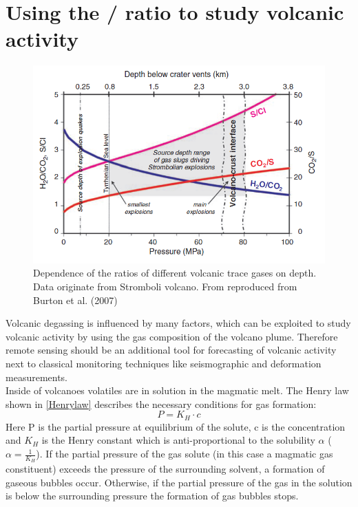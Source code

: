 \documentclass  [
  paper    = a4,
  BCOR     = 10mm,
  twoside,
  fontsize = 12pt,
  fleqn,
  toc      = bibnumbered,
  toc      = listofnumbered,
  numbers  = noendperiod,
  headings = normal,
  listof   = leveldown,
  version  = 3.03
]                                       {scrreprt}
\begin{document}
\section{Using the /  ratio to study volcanic activity}
\begin{figure}[h]
	\centering
	\includegraphics[width=0.9\linewidth]{Zwischenbericht2018/Bilder/so2_bro}
	\caption{Dependence of the ratios of different volcanic trace gases on depth. Data originate from Stromboli volcano. From \citet{lubcke2014optical} reproduced from Burton et al. (2007)}
	\label{fig:so2bro}
\end{figure}    
Volcanic degassing is influenced by many factors, which can be exploited to study volcanic activity by using the gas composition of the volcano plume. Therefore remote sensing should be an additional tool for forecasting of volcanic activity next to classical monitoring techniques like seismographic and deformation measurements.\\
Inside of volcanoes volatiles are in solution in the magmatic melt. The Henry law shown in \cref{Henrylaw} describes the necessary conditions for gas formation:
\begin{equation}
P = K_{H}\cdot c
\label{Henrylaw}
\end{equation}
Here P is the partial pressure at equilibrium of the solute, c is the concentration and $ K_{H}$ is the Henry constant which is anti-proportional to the solubility $\alpha$ ($\alpha = \frac{1}{ K_{H}}$).
If the partial pressure of the gas solute (in this case a magmatic gas constituent) exceeds the pressure of the surrounding solvent, a formation of gaseous bubbles occur. Otherwise, if the partial pressure of the gas in the solution is below the surrounding pressure the formation of gas bubbles stops.\\
\end{document}

